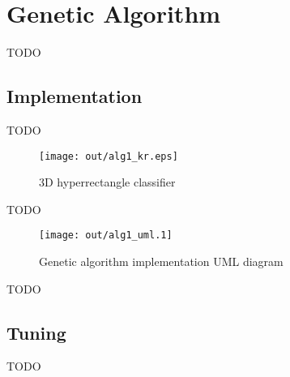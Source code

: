 \documentclass[a4paper]{article}
\title{\DOCTITLE}
\author{\DOCAUTHOR}
\date{\DOCDATE}
\begin{document}
\maketitle

\begin{abstract}
  This report will give an overview of the two nature inspired algorithms that
  were implemented to solve the classification problem, how they differ from
  what was outlined in the proposal and a critical evaluation between the
  performance of both in terms of learning time and classification accuracy.
\end{abstract}

\section{Genetic Algorithm}

TODO

\subsection{Implementation}

TODO

\begin{figure}[h!]
  \centering
  \texttt{[image: out/alg1\_kr.eps]}
  \caption{3D hyperrectangle classifier}
  \label{fig:alg1_kr}
\end{figure}

TODO

\begin{figure}[h!]
  \centering
  \texttt{[image: out/alg1\_uml.1]}
  \caption{Genetic algorithm implementation UML diagram}
  \label{fig:alg1_uml}
\end{figure}

TODO

\subsection{Tuning}

TODO
\end{document}
